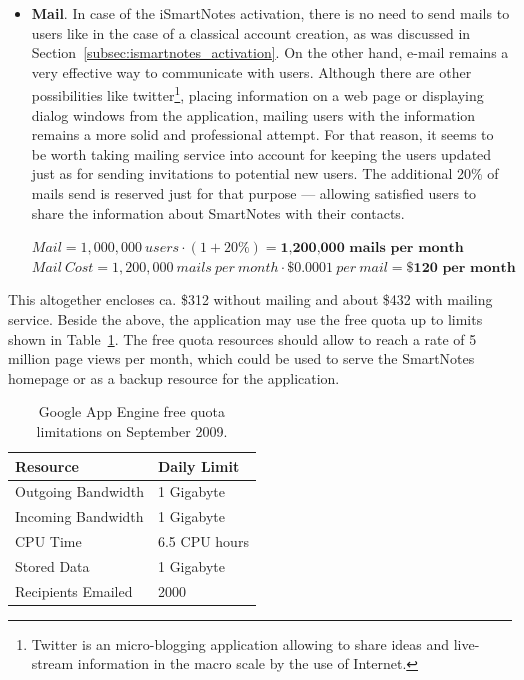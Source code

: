 \begin{itemize}
\item{\textbf{Mail}. In case of the iSmartNotes activation, there is no need to send mails to users like in the case of a classical account creation, as was discussed in Section~\ref{subsec:ismartnotes_activation}. On the other hand, e-mail remains a very effective way to communicate with users. Although there are other possibilities like twitter\footnote{Twitter is an micro-blogging application allowing to share ideas and live-stream information in the macro scale by the use of Internet.}, placing information on a web page or displaying dialog windows from the application, mailing users with the information remains a more solid and professional attempt. For that reason, it seems to be worth taking mailing service into account for keeping the users updated just as for sending invitations to potential new users. The additional 20\% of mails send is reserved just for that purpose --- allowing satisfied users to share the information about SmartNotes with their contacts.
 
$Mail =  1,000,000\ users\cdot (1 + 20\%) = \textbf{1,200,000\ mails\ per\ month}$ \\
$Mail\ Cost = 1,200,000\ mails\ per\ month \cdot \$0.0001\ per\ mail = \textbf{\$120 per\ month}$}
\end{itemize}
 
This altogether encloses ca. \$312 without mailing and about \$432 with mailing service. Beside the above, the application may use the free quota up to limits shown in Table~\ref{tab:gae_free}. The free quota resources should allow to reach a rate of 5 million page views per month, which could be used to serve the SmartNotes homepage or as a backup resource for the application.
\begin{table}[h]
\centering
\caption{Google App Engine free quota limitations on September 2009.}
\label{tab:gae_free}
\begin{tabular}{|l|l|} \hline \hline
\textbf{Resource} & \textbf{Daily Limit} \\ \hline \hline
Outgoing Bandwidth & 1 Gigabyte \\ \hline
Incoming Bandwidth & 1 Gigabyte \\ \hline
CPU Time & 6.5 CPU hours \\ \hline
Stored Data & 1 Gigabyte \\ \hline
Recipients Emailed & 2000 \\ \hline \hline
\end{tabular}
\end{table}
 
